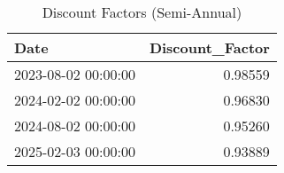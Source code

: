 \begin{table}
\caption{Discount Factors (Semi-Annual)}
\label{tab:Discounts}
\begin{tabular}{lr}
\toprule
Date & Discount_Factor \\
\midrule
2023-08-02 00:00:00 & 0.98559 \\
2024-02-02 00:00:00 & 0.96830 \\
2024-08-02 00:00:00 & 0.95260 \\
2025-02-03 00:00:00 & 0.93889 \\
\bottomrule
\end{tabular}
\end{table}
